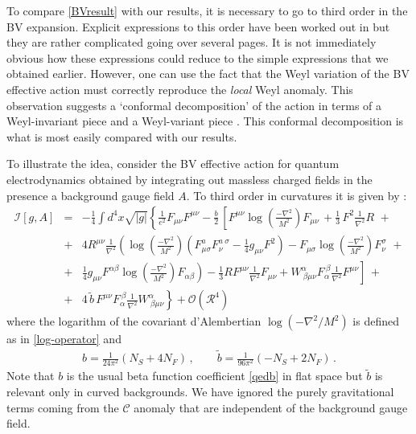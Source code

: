 \documentclass[12pt,a4paper]{article}
\newcommand{\bea}{\begin{eqnarray}}
\newcommand{\eea}{\end{eqnarray}}
\newcommand{\cC}{\mathcal{C}}
\newcommand{\cI}{\mathcal{I}}
\newcommand{\cR}{\mathcal{R}}
\newcommand{\m}{\mu}
\newcommand{\n}{\nu}
\newcommand{\1}{{\textbf{1}}}
\newcommand{\+}{{\,+ \,}}
\begin{document}

To compare \eqref{BVresult} with our results, it is necessary to go to  third order in the BV expansion.  Explicit expressions to this order have been worked out  in  \cite{Barvinsky:1994hw} but they are rather  complicated going over several pages. It is not immediately  obvious how these expressions  could reduce to the simple expressions that we obtained earlier. However,  one can use the fact that the Weyl variation of the  BV effective action must correctly reproduce the \textit{local} Weyl anomaly. 
This observation suggests a `conformal decomposition’ of the action in terms of a Weyl-invariant piece and a Weyl-variant piece \cite{Barvinsky:1994cg,Barvinsky:1995it,Donoghue:2015nba}. This conformal decomposition is what is most easily compared with our results. 

To illustrate the idea, consider the BV effective action for quantum electrodynamics   obtained by integrating out massless charged fields in the presence  a background gauge field $A$.  To third order in curvatures it is given by \cite{Donoghue:2015nba}:
\bea\label{qed-result}
\cI[g, A] &=& -\frac{1}{4}\int d^4x \sqrt{|g|} \left\{ \frac{1}{e^2}F_{\mu\nu}F^{\mu\nu} - \frac{b}{2} \, \left[F^{\mu\nu}\log\left(\frac{-\nabla^2}{M^2}\right)F_{\mu\nu}\,+\frac{1}{3}\, F^2\frac{1}{\nabla^2}R\,\,+\right. \right.  \nonumber \\ 
& +& 4R^{\mu\nu}\frac{1}{\nabla^2}\left(\log\left(\frac{-\nabla^2}{M^2}\right)\left(F^{a}_{\mu\sigma}F^{a\ \sigma}_{\nu}-\frac{1}{4}g_{\mu\nu}F^2\right) - F_{\mu\sigma}\log\left(\frac{-\nabla^2}{M^2}\right)F_{\nu}^{\sigma} \,\, + \right. \nonumber \\ 
&+& \left.\left.\frac{1}{4}g_{\mu\nu}F^{\alpha\beta}\log\left(\frac{-\nabla^2}{M^2}\right)F_{\alpha\beta}\right)-\frac{1}{3}RF^{\mu\nu}\frac{1}{\nabla^2}F_{\mu\nu}+W^{\alpha}_{\ \beta\mu\nu}F_{\alpha}^{\ \beta}\frac{1}{\nabla^2}F^{\mu\nu}\right]\, +\nonumber \nonumber \\ 
&+& \left. 4 \,\tilde b  \, F^{\mu\nu}F_{\alpha}^{\ \beta}\frac{1}{\nabla^2}W^{\alpha}_{\ \beta\mu\nu} \right\} +\mathcal{O}(\mathcal{R}^4)
\eea
where the logarithm of the covariant d’Alembertian $\log (-\nabla^{2}/M^{2})$ is defined as in \eqref{log-operator}
and 
\bea
b = \frac{1}{24\pi^2}\left(N_S+ 4N_F\right) \, , \qquad \tilde b  = \frac{1}{96\pi^2}(-N_{S} + 2 N_{F})\, .
\eea
Note that  $b$ is the usual beta function coefficient \eqref{qedb} in flat space but $\tilde b$ is relevant only in curved backgrounds.
We have ignored the purely gravitational terms coming from the $\cC$ anomaly that are  independent of the background gauge field. 
\end{document}
